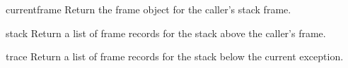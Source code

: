 \begin{funcdesc}{currentframe}{}
  Return the frame object for the caller's stack frame.
\end{funcdesc}

\begin{funcdesc}{stack}{}
  Return a list of frame records for the stack above the caller's
  frame.
\end{funcdesc}

\begin{funcdesc}{trace}{}
  Return a list of frame records for the stack below the current
  exception.
\end{funcdesc}
